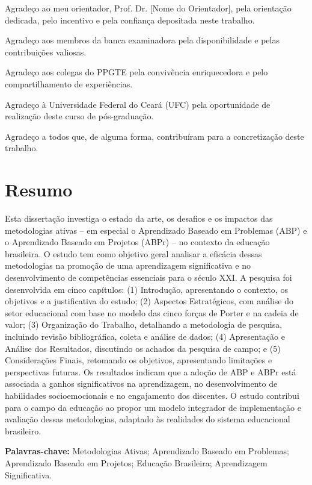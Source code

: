 \documentclass[12pt,a4paper,twoside,openright]{book}
\newcommand{\instituicao}{Universidade Federal do Ceará (UFC)}
\newcommand{\orientador}{Prof. Dr. [Nome do Orientador]}
\begin{document}
Agradeço ao meu orientador, \orientador{}, pela orientação dedicada, pelo incentivo e pela confiança depositada neste trabalho.

Agradeço aos membros da banca examinadora pela disponibilidade e pelas contribuições valiosas.

Agradeço aos colegas do PPGTE pela convivência enriquecedora e pelo compartilhamento de experiências.

Agradeço à \instituicao{} pela oportunidade de realização deste curso de pós-graduação.

Agradeço a todos que, de alguma forma, contribuíram para a concretização deste trabalho.

\newpage

\chapter*{Resumo}

Esta dissertação investiga o estado da arte, os desafios e os impactos das metodologias ativas -- em especial o Aprendizado Baseado em Problemas (ABP) e o Aprendizado Baseado em Projetos (ABPr) -- no contexto da educação brasileira. O estudo tem como objetivo geral analisar a eficácia dessas metodologias na promoção de uma aprendizagem significativa e no desenvolvimento de competências essenciais para o século XXI. A pesquisa foi desenvolvida em cinco capítulos: (1) Introdução, apresentando o contexto, os objetivos e a justificativa do estudo; (2) Aspectos Estratégicos, com análise do setor educacional com base no modelo das cinco forças de Porter e na cadeia de valor; (3) Organização do Trabalho, detalhando a metodologia de pesquisa, incluindo revisão bibliográfica, coleta e análise de dados; (4) Apresentação e Análise dos Resultados, discutindo os achados da pesquisa de campo; e (5) Considerações Finais, retomando os objetivos, apresentando limitações e perspectivas futuras. Os resultados indicam que a adoção de ABP e ABPr está associada a ganhos significativos na aprendizagem, no desenvolvimento de habilidades socioemocionais e no engajamento dos discentes. O estudo contribui para o campo da educação ao propor um modelo integrador de implementação e avaliação dessas metodologias, adaptado às realidades do sistema educacional brasileiro.

\textbf{Palavras-chave:} Metodologias Ativas; Aprendizado Baseado em Problemas; Aprendizado Baseado em Projetos; Educação Brasileira; Aprendizagem Significativa.
\end{document}
